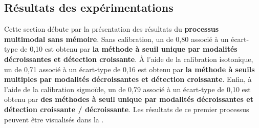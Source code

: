 \subsection{Résultats des expérimentations}
Cette section débute par la présentation des résultats du \textbf{processus multimodal sans mémoire}. Sans calibration, un \fscore{} de 0,80 associé à un écart-type de 0,10 est obtenu par \textbf{la méthode à seuil unique par modalités décroissantes et détection croissante}. À l'aide de la calibration isotonique, un \fscore{} de 0,71 associé à un écart-type de 0,16 est obtenu par \textbf{la méthode à seuils multiples par modalités décroissantes et détection croissante}. Enfin, à l'aide de la calibration sigmoïde, un \fscore{} de 0,79 associé à un écart-type de 0,10 est obtenu par \textbf{des méthodes à seuil unique par modalités décroissantes et détection croissante / décroissante}. Les résultats de ce premier processus peuvent être visualisés dans la .\par

